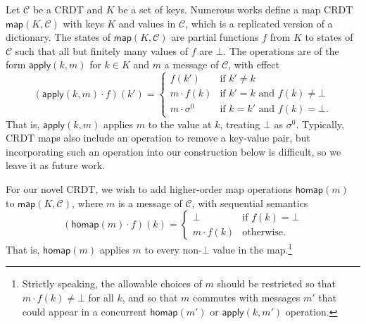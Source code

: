 \documentclass[acmsmall,nonacm]{acmart}
\newcommand{\mc}[1]{\ensuremath{\mathcal{#1}}}
\newcommand{\msf}[1]{\ensuremath{\mathsf{#1}}}
\theoremstyle{plain}
\theoremstyle{definition}
\begin{document}
Let $\mc{C}$ be a CRDT and $K$ be a set of keys.  Numerous works \cite{riak_datatypes, antidote, json} define a map CRDT $\msf{map}(K, \mc{C})$ with keys $K$ and values in $\mc{C}$, which is a replicated version of a dictionary. %
The states of $\msf{map}(K, \mc{C})$ are partial functions $f$ from $K$ to states of $\mc{C}$ such that all but finitely many values of $f$ are $\bot$.  The operations are of the form $\msf{apply}(k, m)$ for $k \in K$ and $m$ a message of $\mc{C}$, with effect
\[
(\msf{apply}(k, m) \cdot f)(k') = \begin{cases} f(k') &\mbox{if $k' \neq k$} \\ m \cdot f(k) &\mbox{if $k' = k$ and $f(k) \neq \bot$} \\ m \cdot \sigma^0 &\mbox{if $k = k'$ and $f(k) = \bot$.} \end{cases}
\]
That is, $\msf{apply}(k, m)$ applies $m$ to the value at $k$, treating $\bot$ as $\sigma^0$.  Typically, CRDT maps also include an operation to remove a key-value pair, but incorporating such an operation into our construction below is difficult, so we leave it as future work.  %

For our novel CRDT, we wish to add higher-order map operations $\msf{homap}(m)$ to $\msf{map}(K, \mc{C})$, where $m$ is a message of $\mc{C}$, with sequential semantics
\[
(\msf{homap}(m) \cdot f)(k) = \begin{cases} \bot &\mbox{if $f(k) = \bot$} \\ m \cdot f(k) &\mbox{otherwise.} \end{cases}
\]
That is, $\msf{homap}(m)$ applies $m$ to every non-$\bot$ value in the map.\footnote{Strictly speaking, the allowable choices of $m$ should be restricted so that $m \cdot f(k) \neq \bot$ for all $k$, and so that $m$ commutes with messages $m'$ that could appear in a concurrent $\msf{homap}(m')$ or $\msf{apply}(k, m')$ operation.}
\end{document}
